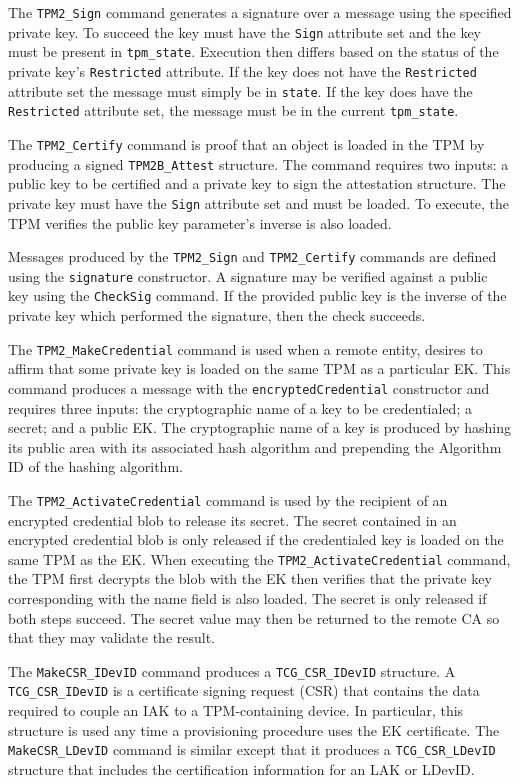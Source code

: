 \documentclass[runningheads]{llncs}
\begin{document}
The \verb|TPM2_Sign| command generates a signature over a message
using the specified private key.  To succeed the key must have the
\verb|Sign| attribute set and the key must be present in
\verb|tpm_state|. Execution then differs based on the status of the
private key's \verb|Restricted| attribute. If the key does not have
the \verb|Restricted| attribute set the message must simply be in
\verb|state|. If the key does have the \verb|Restricted| attribute
set, the message must be in the current \verb|tpm_state|.

The \verb|TPM2_Certify| command is proof that an object is loaded in
the TPM by producing a signed \verb|TPM2B_Attest| structure. The
command requires two inputs: a public key to be certified and a
private key to sign the attestation structure. The private key must
have the \verb|Sign| attribute set and must be loaded. To execute, the
TPM verifies the public key parameter's inverse is also
loaded.

Messages produced by the \verb|TPM2_Sign| and \verb|TPM2_Certify|
commands are defined using the \verb|signature| constructor. A
signature may be verified against a public key using the
\verb|CheckSig| command. If the provided public key is the inverse of
the private key which performed the signature, then the check
succeeds.

The \verb|TPM2_MakeCredential| command is used when a remote entity,
desires to affirm that some private key is loaded on the same TPM as a
particular EK. This command produces a message with the
\verb|encryptedCredential| constructor and requires three inputs: the
cryptographic name of a key to be credentialed; a secret; and a public
EK. The cryptographic name of a key is produced by hashing its public
area with its associated hash algorithm and prepending the Algorithm
ID of the hashing algorithm.

The \verb|TPM2_ActivateCredential| command is used by the recipient of
an encrypted credential blob to release its secret.  The secret
contained in an encrypted credential blob is only released if the
credentialed key is loaded on the same TPM as the EK.  When executing
the \verb|TPM2_ActivateCredential| command, the TPM first decrypts the
blob with the EK then verifies that the private key corresponding with
the name field is also loaded. The secret is only released if both
steps succeed. The secret value may then be returned to the remote CA
so that they may validate the result.

The \verb|MakeCSR_IDevID| command produces a \verb|TCG_CSR_IDevID|
structure.  A \verb|TCG_CSR_IDevID| is a certificate signing request
(CSR) that contains the data required to couple an IAK to a
TPM-containing device.  In particular, this structure is used any time
a provisioning procedure uses the EK certificate.  The
\verb|MakeCSR_LDevID| command is similar except that it produces a
\verb|TCG_CSR_LDevID| structure that includes the certification
information for an LAK or LDevID.
\end{document}
